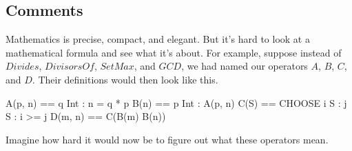 
  \vspace{-\baselineskip}%
%
\subsection{Comments} 

Mathematics is precise, compact, and elegant.  But it's hard to look
at a mathematical formula and see what it's about.  For example, suppose
instead of $Divides$, $DivisorsOf$, $SetMax$, and $GCD$,
we had named our operators $A$, $B$, $C$, and $D$.  Their definitions 
would then look like this.
\begin{display}
\begin{notla}
A(p, n) == \E q \in Int : n = q * p
B(n)    == {p \in Int : A(p, n)}
C(S)    == CHOOSE i \in S : \A j \in S : i >= j
D(m, n) == C(B(m) \cap B(n))
\end{notla}
\begin{tlatex}
%
%
\end{tlatex}
\end{display}
Imagine how hard it would now be to figure out what these operators mean.

